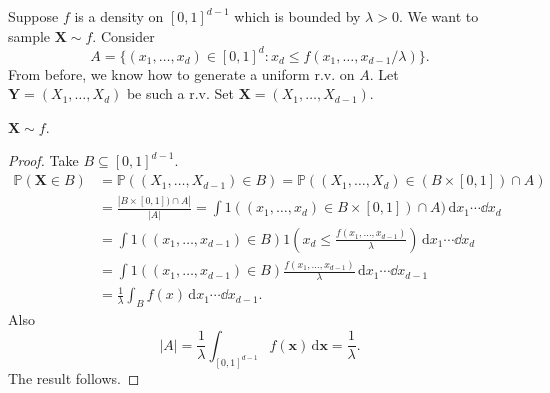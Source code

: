 Suppose $f$ is a density on $ [0,1]^{d-1} $ which is bounded by $ \lambda>0 $. We want to sample $ \mathbf{X} \sim f $. Consider 
\[
    A = \{(x_1,\dots,x_d)\in [0,1]^d:x_d\le f(x_1,\dots,x_{d-1}/\lambda)\}.
\]
From before, we know how to generate a uniform r.v. on $A$. Let $ \mathbf{Y}=(X_1,\dots,X_d) $ be such a r.v. Set $ \mathbf{X} = (X_1,\dots,X_{d-1}) $.

\begin{claim}
    $ \mathbf{X} \sim f $.
\end{claim}

\begin{proof}
    Take $ B \subseteq [0,1]^{d-1} $.
    \begin{align*}
        \mathbb{P}(\mathbf{X}\in B)&= \mathbb{P}((X_1,\dots,X_{d-1})\in B)=\mathbb{P}((X_1,\dots,X_d)\in (B \times [0,1])\cap A)\\ 
        &= \frac{|B \times [0,1])\cap A|}{|A|} = \int 1((x_1,\dots,x_d)\in B \times [0,1])\cap A) \,\mathrm{d}x_1\cdots\dd x_d\\ 
        &= \int 1((x_1,\dots,x_{d-1})\in B)1\left( x_d\le \frac{f(x_1,\dots,x_{d-1})}{\lambda} \right) \,\mathrm{d}x_1\cdots\dd x_d\\ 
        &= \int 1((x_1,\dots,x_{d-1})\in B)\frac{f(x_1,\dots,x_{d-1})}{\lambda} \,\mathrm{d}x_1\cdots\dd x_{d-1}\\
        &= \frac{1}{\lambda}\int_B f(x) \,\mathrm{d}x_1\cdots\dd x_{d-1}.
    \end{align*}
    Also 
    \[
        |A|=\frac{1}{\lambda}\int_{[0,1]^{d-1}} f(\mathbf{x}) \,\mathrm{d}\mathbf{x}=\frac{1}{\lambda}.
    \]
    The result follows.
\end{proof}